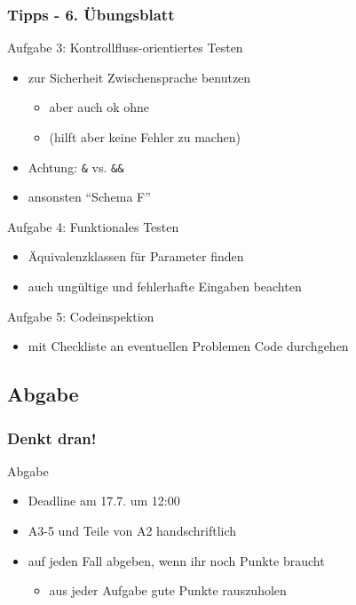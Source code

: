 \documentclass[18pt]{beamer}
\begin{document}
	\begin{frame}
		\frametitle{Tipps - 6. Übungsblatt}
		\begin{exampleblock}{Aufgabe 3: Kontrollfluss-orientiertes Testen}
			\begin{itemize}
				\item zur Sicherheit Zwischensprache benutzen
				\begin{itemize}
					\item aber auch ok ohne
					\item (hilft aber keine Fehler zu machen)
				\end{itemize}
				\item Achtung: \texttt{\&} vs. \texttt{\&\&}
				\item ansonsten \enquote{Schema F}
			\end{itemize}
		\end{exampleblock}
		\pause
		\begin{exampleblock}{Aufgabe 4: Funktionales Testen}
			\begin{itemize}
				\item Äquivalenzklassen für Parameter finden
				\item auch ungültige und fehlerhafte Eingaben beachten
			\end{itemize}
		\end{exampleblock}
		\pause
		\begin{exampleblock}{Aufgabe 5: Codeinspektion}
			\begin{itemize}
				\item mit Checkliste an eventuellen Problemen Code durchgehen
			\end{itemize}
		\end{exampleblock}

	\end{frame}

	\subsection{Abgabe}
	\begin{frame}
		\frametitle{Denkt dran!}
		\begin{alertblock}{Abgabe}
			\begin{itemize}
				\item Deadline am 17.7. um 12:00
				\item A3-5 und Teile von A2 handschriftlich
				\item auf jeden Fall abgeben, wenn ihr noch Punkte braucht
				\begin{itemize}
					\item aus jeder Aufgabe gute Punkte rauszuholen
				\end{itemize}
			\end{itemize}
		\end{alertblock}
	\end{frame}
\end{document}
